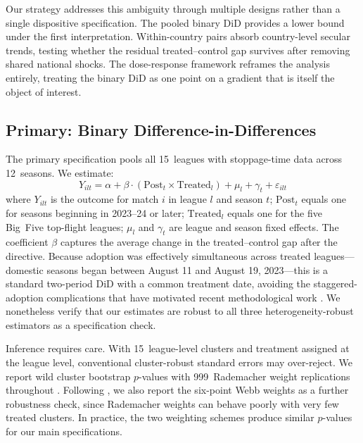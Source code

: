 Our strategy addresses this ambiguity through multiple designs rather
than a single dispositive specification. The pooled binary DiD
provides a lower bound under the first interpretation. Within-country
pairs absorb country-level secular trends, testing whether the
residual treated--control gap survives after removing shared national
shocks. The dose-response framework reframes the analysis entirely,
treating the binary DiD as one point on a gradient that is itself
the object of interest.

\subsection{Primary: Binary Difference-in-Differences}

The primary specification pools all 15~leagues with stoppage-time data
across 12~seasons. We estimate:
%
\begin{equation}\label{eq:did}
  Y_{ilt} = \alpha + \beta \cdot (\text{Post}_t \times \text{Treated}_l)
  + \mu_l + \gamma_t + \varepsilon_{ilt}
\end{equation}
%
where $Y_{ilt}$ is the outcome for match $i$ in league $l$ and season
$t$; $\text{Post}_t$ equals one for seasons beginning in 2023--24 or
later; $\text{Treated}_l$ equals one for the five Big~Five top-flight
leagues; $\mu_l$ and $\gamma_t$ are league and season fixed effects.
The coefficient $\beta$ captures the average change in the treated--control
gap after the directive. Because adoption was effectively simultaneous
across treated leagues---domestic seasons began between August 11 and
August 19, 2023---this is a standard two-period DiD with a common
treatment date, avoiding the staggered-adoption complications that
have motivated recent methodological work
\citep{goodmanbacon2021difference, callaway2021difference,
sunAbraham2021, borusyak2024revisiting}. We nonetheless verify that
our estimates are robust to all three heterogeneity-robust estimators
as a specification check.

Inference requires care. With 15~league-level clusters and treatment
assigned at the league level, conventional cluster-robust standard
errors may over-reject. We report wild cluster bootstrap $p$-values
with 999~Rademacher weight replications throughout
\citep{cameron2008bootstrap}. Following \citet{webb2023reworking}, we
also report the six-point Webb weights as a further robustness check,
since Rademacher weights can behave poorly with very few treated
clusters. In practice, the two weighting schemes produce similar
$p$-values for our main specifications.

